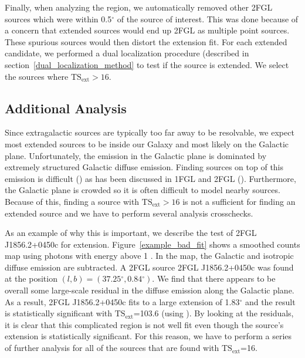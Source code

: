 \documentclass[12pt,preprint]{aastex}
\newcommand{\gev}{\text{GeV}\xspace}
\newcommand{\tsext}{{\ensuremath{\text{TS}_\text{ext}}}\xspace}
\renewcommand{\deg}{\ensuremath{^\circ}\xspace}
\newcommand{\pointlike}{\text{\em pointlike}\xspace}
\begin{document}
Finally, when analyzing the region, we automatically removed other
2FGL sources which were within 0.5\deg of the source of interest. This was done because of
a concern that extended sources would end up 2FGL as
multiple point sources. These spurious sources would then
distort the extension fit.
For each extended candidate, we performed a dual localization procedure
(described in section~\ref{dual_localization_method} to test if the
source is extended. We select the sources where $\tsext>16$.

\subsection{Additional Analysis}

Since extragalactic sources are typically too far away to be resolvable,
we expect most extended sources to be inside our Galaxy and most
likely on the Galactic plane.  Unfortunately, the \gev emission
in the Galactic plane is dominated by extremely structured Galactic
diffuse emission.  Finding sources on top of this emission is difficult
(\cite{first_diffuse_paper}) as has been discussed in 1FGL and 2FGL
(\cite{first_cat,second_cat}).  Furthermore, the Galactic plane is crowded
so it is often difficult to model nearby sources.  Because of this,
finding a source with $\tsext>16$ is not a sufficient for finding
an extended source and we have to perform several analysis crosschecks.

As an example of why this is important, we describe the test of 2FGL
J1856.2+0450c for extension.  Figure~\ref{example_bad_fit} shows
a smoothed counts map using photons with energy above 1 \gev. In
the map, the Galactic and isotropic diffuse emission are subtracted.
A 2FGL source 2FGL J1856.2+0450c was found at the position
$(l,b)=(37.25\deg,0.84\deg)$.  We find that there appears to be overall
some large-scale residual in the diffuse emission along the Galactic
plane. As a result, 2FGL J1856.2+0450c fits to a
large extension of 1.83\deg and the result is statistically significant
with \tsext=103.6 (using \pointlike).  By looking at the residuals, it is clear that this
complicated region is not well fit even though the source's extension is
statistically significant. For this reason, we have to perform a series
of further analysis for all of the sources that are found with \tsext=16.
\end{document}
